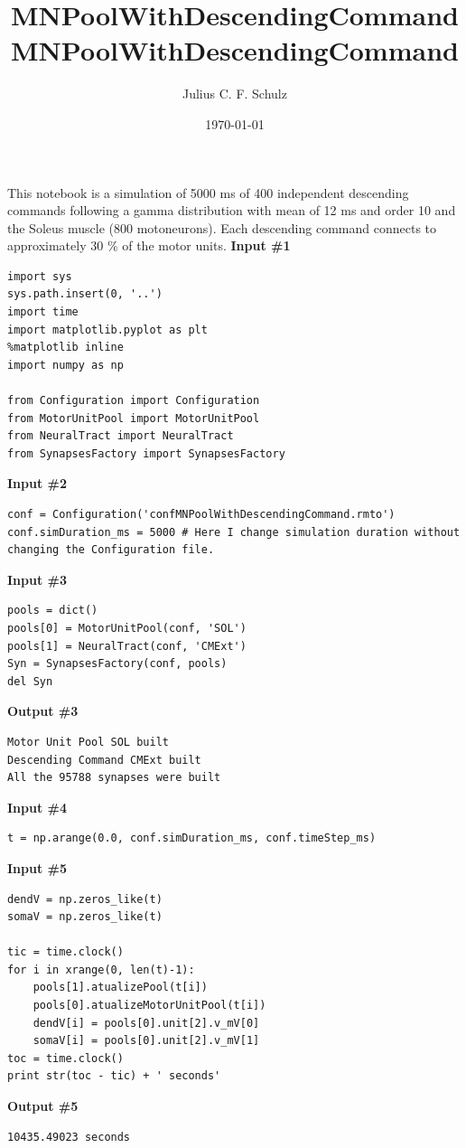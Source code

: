 \documentclass{article}
\title{MNPoolWithDescendingCommand}
\begin{document}
    
    
    \author{Julius C. F. Schulz}\title{MNPoolWithDescendingCommand}

\date{\today}
\maketitle

    
    

    
    This notebook is a simulation of 5000 ms of 400 independent descending
commands following a gamma distribution with mean of 12 ms and order 10
and the Soleus muscle (800 motoneurons). Each descending command
connects to approximately 30 \% of the motor units.
\newline\textbf{Input \#{}1}\begin{verbatim}
import sys
sys.path.insert(0, '..')
import time
import matplotlib.pyplot as plt
%matplotlib inline  
import numpy as np

from Configuration import Configuration
from MotorUnitPool import MotorUnitPool
from NeuralTract import NeuralTract
from SynapsesFactory import SynapsesFactory

\end{verbatim}\newline\textbf{Input \#{}2}\begin{verbatim}
conf = Configuration('confMNPoolWithDescendingCommand.rmto')
conf.simDuration_ms = 5000 # Here I change simulation duration without changing the Configuration file.
\end{verbatim}\newline\textbf{Input \#{}3}\begin{verbatim}
pools = dict()
pools[0] = MotorUnitPool(conf, 'SOL')
pools[1] = NeuralTract(conf, 'CMExt')
Syn = SynapsesFactory(conf, pools)
del Syn
\end{verbatim}\textbf{Output \#{}3}
    \begin{Verbatim}[commandchars=\\\{\}]
Motor Unit Pool SOL built
Descending Command CMExt built
All the 95788 synapses were built

    \end{Verbatim}
\newline\textbf{Input \#{}4}\begin{verbatim}
t = np.arange(0.0, conf.simDuration_ms, conf.timeStep_ms)
\end{verbatim}\newline\textbf{Input \#{}5}\begin{verbatim}
dendV = np.zeros_like(t)
somaV = np.zeros_like(t)

tic = time.clock()
for i in xrange(0, len(t)-1):
    pools[1].atualizePool(t[i])
    pools[0].atualizeMotorUnitPool(t[i])
    dendV[i] = pools[0].unit[2].v_mV[0]
    somaV[i] = pools[0].unit[2].v_mV[1] 
toc = time.clock()
print str(toc - tic) + ' seconds'
\end{verbatim}\textbf{Output \#{}5}
    \begin{Verbatim}[commandchars=\\\{\}]
10435.49023 seconds

    \end{Verbatim}
\end{document}
